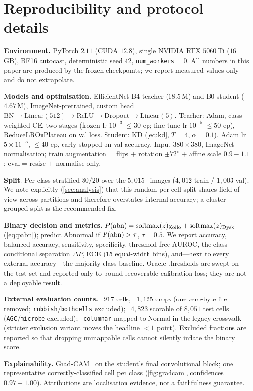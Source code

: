 \section{Reproducibility and protocol details}
\label{sec:appA}

\noindent\textbf{Environment.} PyTorch $2.11$ (CUDA $12.8$), single NVIDIA RTX $5060$\,Ti ($16$\,GB),
BF16 autocast, deterministic seed $42$, \texttt{num\_workers}$=0$. All numbers in this paper are
produced by the frozen checkpoints; we report measured values only and do not extrapolate.

\noindent\textbf{Models and optimisation.} EfficientNet-B4 teacher ($18.5$\,M) and B0 student
($4.67$\,M), ImageNet-pretrained, custom head $\mathrm{BN}\!\to\!\mathrm{Linear}(512)\!\to\!
\mathrm{ReLU}\!\to\!\mathrm{Dropout}\!\to\!\mathrm{Linear}(5)$. Teacher: Adam, class-weighted CE,
two stages (frozen lr $10^{-3}$ $\le\!30$ ep; fine-tune lr $10^{-5}$ $\le\!50$ ep), ReduceLROnPlateau
on val loss. Student: KD (\cref{eq:kd}, $T{=}4$, $\alpha{=}0.1$), Adam lr $5\!\times\!10^{-5}$,
$\le\!40$ ep, early-stopped on val accuracy. Input $380\!\times\!380$, ImageNet normalisation; train
augmentation = flips $+$ rotation $\pm72^{\circ}$ $+$ affine scale $0.9\!-\!1.1$; eval = resize $+$
normalise only.

\noindent\textbf{Split.} Per-class stratified $80/20$ over the $5{,}015$ \sipakmed\ images
($4{,}012$ train / $1{,}003$ val). We note explicitly (\cref{sec:analysis}) that this random per-cell
split shares field-of-view across partitions and therefore overstates internal accuracy; a
cluster-grouped split is the recommended fix.

\noindent\textbf{Binary decision and metrics.} $P(\mathrm{abn})=\operatorname{softmax}(z)_{\text{Koilo}}+\operatorname{softmax}(z)_{\text{Dysk}}$
(\cref{eq:pabn}); predict Abnormal if $P(\mathrm{abn})>\tau$, $\tau{=}0.5$. We report accuracy, balanced
accuracy, sensitivity, specificity, threshold-free AUROC, the class-conditional separation
$\Delta P$, ECE ($15$ equal-width bins), and---next to every external accuracy---the majority-class
baseline. Oracle thresholds are swept on the test set and reported only to bound recoverable
calibration loss; they are not a deployable result.

\noindent\textbf{External evaluation counts.} \herlev\ $917$ cells; \apacc\ $1{,}125$ crops (one
zero-byte file removed; \texttt{rubbish}/\texttt{bothcells} excluded); \hicervix\ $4{,}823$ scorable of
$8{,}051$ test cells (\texttt{AGC}/\texttt{microbe} excluded); \herlev\ \texttt{columnar} mapped to Normal
in the legacy crosswalk (stricter exclusion variant moves the headline $<\!1$ point). Excluded
fractions are reported so that dropping unmappable cells cannot silently inflate the binary score.

\noindent\textbf{Explainability.} Grad-CAM~\cite{selvaraju2017gradcam} on the student's final
convolutional block; one representative correctly-classified cell per class
(\cref{fig:gradcam}, confidences $0.97\!-\!1.00$). Attributions are localisation evidence, not a
faithfulness guarantee.
